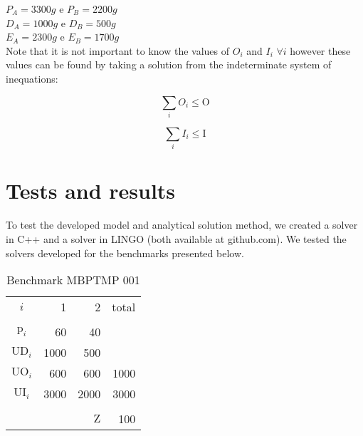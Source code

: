 \documentclass[preprint,12pt,authoryear]{elsarticle}
\begin{document}
$P_A = 3300g$ e $P_B=2200g$ \\

$D_A = 1000g$ e $D_B = 500g$ \\

$E_A = 2300g$ e $E_B = 1700g$ \\

Note that it is not important to know the values of $O_i$ and $I_i$ $\forall i$ however these values can be found by taking a solution from the indeterminate system of inequations:

\begin{equation}
\sum_i{O_i} \leq \textrm{O}
\end{equation}

\begin{equation}
\sum_i{I_i} \leq \textrm{I}
\end{equation}

\section{Tests and results}
\label{sec:results}

To test the developed model and analytical solution method, we created a solver in C++ and a solver in LINGO (both available at github.com). We tested the solvers developed for the benchmarks presented below. 

\begin{table}[h]
\begin{center}
\begin{tabular}[c]{c r r r}
$i$ & 1 & 2 & total \\
\cline {1-4} \\
$\textrm{p}_i$ & 60 & 40 & \\
$\textrm{UD}_i$ & 1000 & 500 & \\
$\textrm{UO}_i$ & 600 & 600 & 1000 \\
$\textrm{UI}_i$ & 3000 & 2000 & 3000 \\
\cline {1-4} \\
& & $\textrm{Z}$ & 100 \\
\end{tabular}
\label{tab:MBPTMP 001}
\caption{Benchmark MBPTMP 001}
\end{center}
\end{table}
\end{document}
